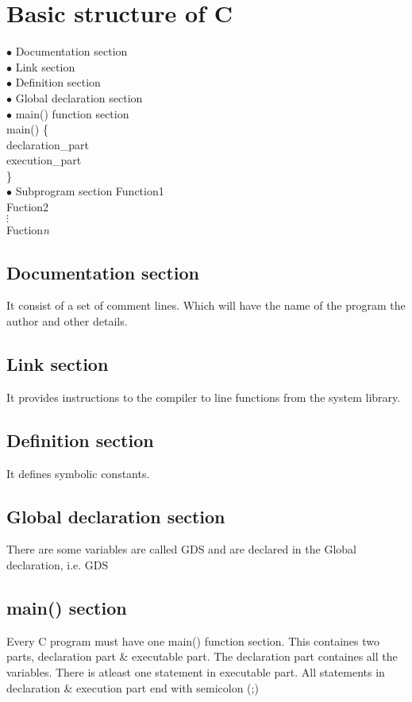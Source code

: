 \documentclass{article}
\begin{document}
	\section{Basic structure of C}
	$ \bullet $ Documentation section \\
	$ \bullet $ Link section \\
	$ \bullet $ Definition section \\
	$ \bullet $ Global declaration section \\
	$ \bullet $ main() function section \\
	{
		\tabto{0.5cm} \code main() \{ \\ 
			\tabto{1cm} declaration\_part \\ 
			\tabto{1cm} execution\_part \\ 
		\tabto{0.5cm} \} 
	} \\
	$ \bullet $ Subprogram section
	{
		\tabto{1cm} \code Function1 \\
		\tabto{1cm}Fuction2 \\
		\tabto{1.5cm} $ \vdots $ \\
		\tabto{1cm} Fuction\textit{n} \\
	}

	\newpage

	\subsection{Documentation section}
	It consist of a set of comment lines. Which will have the name of the program the author and other details.
	
	\subsection{Link section}
	It provides instructions to the compiler to line functions from the system library.
	
	\subsection{Definition section}
	It defines symbolic constants.
	
	\subsection{Global declaration section}
	There are some variables are called GDS and are declared in the Global declaration, i.e. GDS
	
	\subsection{main() section}
	Every C program must have one {\code main()} function section. This containes two parts,
	declaration part \& executable part. The declaration part containes all the variables. There is atleast one statement in executable part. All statements in declaration \& execution part end with semicolon (;)
	
\end{document}
